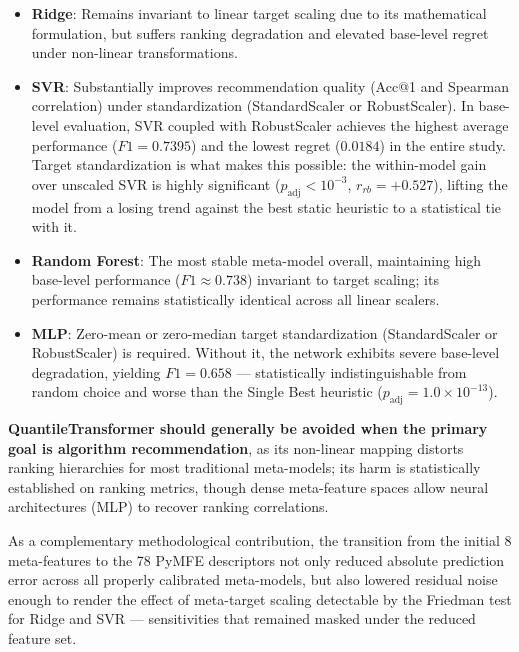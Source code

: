\documentclass[12pt]{article}
\begin{document}
\begin{itemize}
  \item \textbf{Ridge}: Remains invariant to linear target scaling due to its mathematical formulation, but suffers ranking degradation and elevated base-level regret under non-linear transformations.
  \item \textbf{SVR}: Substantially improves recommendation quality (Acc@1 and Spearman correlation) under standardization (StandardScaler or RobustScaler). In base-level evaluation, SVR coupled with RobustScaler achieves the highest average performance ($F1 = 0.7395$) and the lowest regret ($0.0184$) in the entire study. Target standardization is what makes this possible: the within-model gain over unscaled SVR is highly significant ($p_{\text{adj}} < 10^{-3}$, $r_{rb} = +0.527$), lifting the model from a losing trend against the best static heuristic to a statistical tie with it.
  \item \textbf{Random Forest}: The most stable meta-model overall, maintaining high base-level performance ($F1 \approx 0.738$) invariant to target scaling; its performance remains statistically identical across all linear scalers.
  \item \textbf{MLP}: Zero-mean or zero-median target standardization (StandardScaler or RobustScaler) is required. Without it, the network exhibits severe base-level degradation, yielding $F1 = 0.658$ --- statistically indistinguishable from random choice and worse than the Single Best heuristic ($p_{\text{adj}} = 1.0 \times 10^{-13}$).
\end{itemize}

\textbf{QuantileTransformer should generally be avoided when the primary goal is algorithm recommendation}, as its non-linear mapping distorts ranking hierarchies for most traditional meta-models; its harm is statistically established on ranking metrics, though dense meta-feature spaces allow neural architectures (MLP) to recover ranking correlations.

As a complementary methodological contribution, the transition from the initial 8 meta-features to the 78 PyMFE descriptors not only reduced absolute prediction error across all properly calibrated meta-models, but also lowered residual noise enough to render the effect of meta-target scaling detectable by the Friedman test for Ridge and SVR --- sensitivities that remained masked under the reduced feature set.
\end{document}
